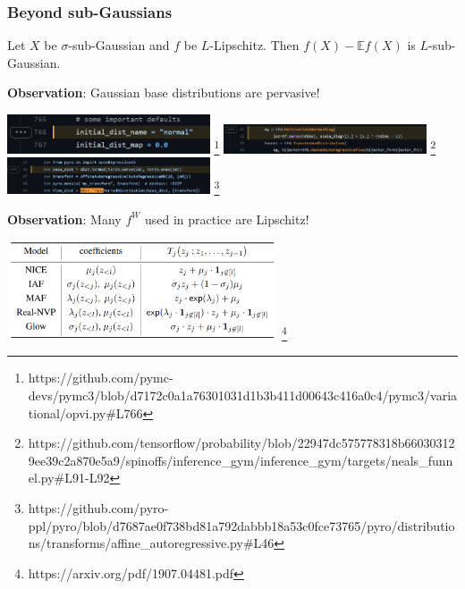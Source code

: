 \documentclass{beamer}
\newcommand{\EE}{\mathbb{E}}
\begin{document}
\begin{frame}[allowframebreaks]
    \frametitle{Beyond sub-Gaussians}

    \begin{theorem}
        Let $X$ be $\sigma$-sub-Gaussian and $f$ be $L$-Lipschitz.
        Then $f(X) - \EE f(X)$ is $L$-sub-Gaussian.
    \end{theorem}

    \textbf{Observation}: Gaussian base distributions are pervasive!
    \begin{center}
        \includegraphics[width=0.45\textwidth]{Figures/pymc-normal.png}
        \footnote{https://github.com/pymc-devs/pymc3/blob/d7172c0a1a76301031d1b3b411d00643c416a0c4/pymc3/variational/opvi.py\#L766}
        \includegraphics[width=0.45\textwidth]{Figures/tfp-normal.png}
        \footnote{https://github.com/tensorflow/probability/blob/22947dc575778318b660303129ee39c2a870e5a9/spinoffs/inference\_gym/inference\_gym/targets/neals\_funnel.py\#L91-L92}
        \includegraphics[width=0.45\textwidth]{Figures/pyro-normal.png}
        \footnote{https://github.com/pyro-ppl/pyro/blob/d7687ae0f738bd81a792dabbb18a53c0fce73765/pyro/distributions/transforms/affine\_autoregressive.py\#L46}
    \end{center}

    \textbf{Observation}: Many $f^W$ used in practice are Lipschitz!

    \begin{center}
        \includegraphics[width=0.6\textwidth]{Figures/jaini-table-1.png}
        \footnote{https://arxiv.org/pdf/1907.04481.pdf}
    \end{center}


\end{frame}
\end{document}
